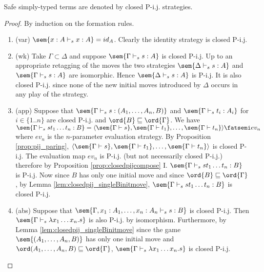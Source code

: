 \begin{proposition}
  Safe simply-typed terms are denoted by closed P-i.j. strategies.
\end{proposition}
\begin{proof}
  By induction on the formation rules.
  \begin{enumerate}
    \item (var) $\sem{x:A \vdash_s x:A } = id_A$. Clearly the
    identity strategy is closed P-i.j.

    \item (wk) Take $\Gamma \subset \Delta $ and suppose $\sem{\Gamma \vdash_s
    s : A}$ is closed P-i.j. Up to an appropriate retagging of
    the moves the two strategies $\sem{\Delta \vdash_s s : A}$
    and $\sem{\Gamma \vdash_s s : A}$ are isomorphic. Hence
    $\sem{\Delta \vdash_s s : A}$ is P-i.j. It is also closed
    P-i.j. since none of the new initial moves introduced by
    $\Delta$ occurs in any play of the strategy.

    \item (app) Suppose that $\sem{\Gamma \vdash_s s :
    (A_1,\ldots,A_n,B)}$ and $\sem{\Gamma \vdash_s t_i : A_i}$
    for $i \in \{1..n\}$ are closed P-i.j. and $\ord{B}
    \sqsubseteq \ord{\Gamma}$. We have $\sem{ \Gamma \vdash_s s
    t_1 \ldots t_n : B} = \langle \sem{\Gamma \vdash s},
    \sem{\Gamma \vdash t_1}, \ldots, \sem{\Gamma \vdash t_n}
    \rangle \fatsemi ev_n$ where $ev_n$ is the $n$-parameter
    evaluation strategy. By Proposition \ref{prop:pij_paring},
    $\langle \sem{\Gamma \vdash s}, \sem{\Gamma \vdash t_1} ,
    \ldots, \sem{\Gamma \vdash t_n} \rangle$ is closed P-i.j.
    The evaluation map $ev_n$ is P-i.j. (but not necessarily
    closed P-i.j.) therefore by Proposition
    \ref{prop:closedpijcompose} I. $\sem{ \Gamma \vdash_s s t_1
    \ldots t_n : B}$ is P-i.j. Now since $B$ has only one
    initial move and since $\ord{B} \sqsubseteq \ord{\Gamma}$,
    by Lemma \ref{lem:closedpij_singleBinitmove}, $\sem{ \Gamma
    \vdash_s s t_1 \ldots t_n : B}$ is closed P-i.j.

    \item (abs) Suppose that $\sem{\Gamma, x_1 : A_1, \ldots, x_n : A_n \vdash_s
    s : B}$ is closed P-i.j. Then $\sem{\Gamma \vdash_s \lambda
    x_1 \ldots x_n . s }$ is also P-i.j. by isomorphism.
    Furthermore, by Lemma \ref{lem:closedpij_singleBinitmove}
    since the game $\sem{(A_1, \ldots ,A_n,B)}$ has only one
    initial move and $\ord (A_1, \ldots ,A_n,B) \sqsubseteq
    \ord{\Gamma}$, $\sem{\Gamma \vdash_s \lambda x_1 \ldots x_n
    . s }$ is closed P-i.j.
  \end{enumerate}
\end{proof}


